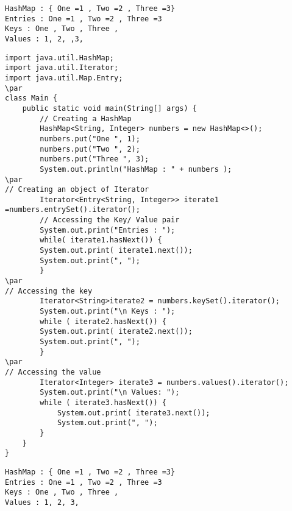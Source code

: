 \documentclass{book}
\def\lthtmlcheckvsize{\ifdim\ht\sizebox<\vsize 
  \ifdim\wd\sizebox<\hsize\expandafter\hfill\fi \expandafter\vfill
  \else\expandafter\vss\fi}%
\begin{document}
{\newpage\clearpage
{}%
\begin{lstlisting}
HashMap : { One =1 , Two =2 , Three =3}
Entries : One =1 , Two =2 , Three =3
Keys : One , Two , Three ,
Values : 1, 2, ,3,
\end{lstlisting}%
\lthtmlfigureZ
\lthtmlcheckvsize\clearpage}

{\newpage\clearpage
{}%
\begin{lstlisting}
import java.util.HashMap;
import java.util.Iterator;
import java.util.Map.Entry;
\par
class Main {
	public static void main(String[] args) {
		// Creating a HashMap
		HashMap<String, Integer> numbers = new HashMap<>();
		numbers.put("One ", 1);
		numbers.put("Two ", 2);
		numbers.put("Three ", 3);
		System.out.println("HashMap : " + numbers );
\par
// Creating an object of Iterator
		Iterator<Entry<String, Integer>> iterate1 =numbers.entrySet().iterator();
		// Accessing the Key/ Value pair
		System.out.print("Entries : ");
		while( iterate1.hasNext()) {
		System.out.print( iterate1.next());
		System.out.print(", ");
		}
\par
// Accessing the key
		Iterator<String>iterate2 = numbers.keySet().iterator();
		System.out.print("\n Keys : ");
		while ( iterate2.hasNext()) {
		System.out.print( iterate2.next());
		System.out.print(", ");
		}
\par
// Accessing the value
		Iterator<Integer> iterate3 = numbers.values().iterator();
		System.out.print("\n Values: ");
		while ( iterate3.hasNext()) {
			System.out.print( iterate3.next());
			System.out.print(", ");
		}
	}
}
\end{lstlisting}%
\lthtmlfigureZ
\lthtmlcheckvsize\clearpage}

{\newpage\clearpage
{}%
\begin{lstlisting}
HashMap : { One =1 , Two =2 , Three =3}
Entries : One =1 , Two =2 , Three =3
Keys : One , Two , Three ,
Values : 1, 2, 3,
\end{lstlisting}%
\lthtmlfigureZ
\lthtmlcheckvsize\clearpage}
\end{document}
